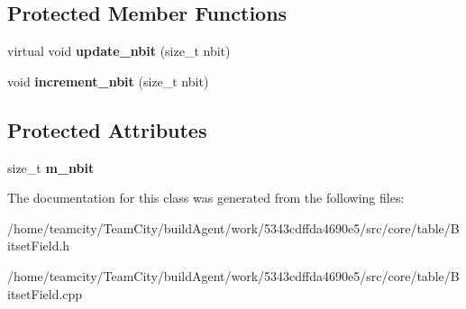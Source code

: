 \subsection*{Protected Member Functions}
\begin{DoxyCompactItemize}
\item 
virtual void {\bfseries update\+\_\+nbit} (size\+\_\+t nbit)\hypertarget{classBitsetField_ad8fadd64db86e4df4566d07633a0f2d0}{}\label{classBitsetField_ad8fadd64db86e4df4566d07633a0f2d0}

\item 
void {\bfseries increment\+\_\+nbit} (size\+\_\+t nbit)\hypertarget{classBitsetField_a42665f70a291b36fbd68f119094b1768}{}\label{classBitsetField_a42665f70a291b36fbd68f119094b1768}

\end{DoxyCompactItemize}
\subsection*{Protected Attributes}
\begin{DoxyCompactItemize}
\item 
size\+\_\+t {\bfseries m\+\_\+nbit}\hypertarget{classBitsetField_aa93dab557a478225c412d7aa0683396b}{}\label{classBitsetField_aa93dab557a478225c412d7aa0683396b}

\end{DoxyCompactItemize}


The documentation for this class was generated from the following files\+:\begin{DoxyCompactItemize}
\item 
/home/teamcity/\+Team\+City/build\+Agent/work/5343cdffda4690e5/src/core/table/Bitset\+Field.\+h\item 
/home/teamcity/\+Team\+City/build\+Agent/work/5343cdffda4690e5/src/core/table/Bitset\+Field.\+cpp\end{DoxyCompactItemize}
